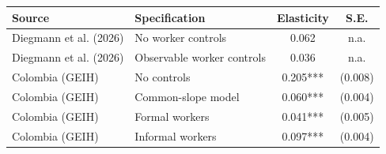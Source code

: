 \begin{tabular}{p{}p{}cc}
\toprule
    Source & Specification & Elasticity & S.E. \\
    \midrule
Diegmann et al. (2026) & No worker controls & 0.062 & n.a. \\
Diegmann et al. (2026) & Observable worker controls & 0.036 & n.a. \\
\midrule
    Colombia (GEIH) & No controls & 0.205*** & (0.008) \\
Colombia (GEIH) & Common-slope model & 0.060*** & (0.004) \\
Colombia (GEIH) & Formal workers & 0.041*** & (0.005) \\
Colombia (GEIH) & Informal workers & 0.097*** & (0.004)\\
\bottomrule\end{tabular}
